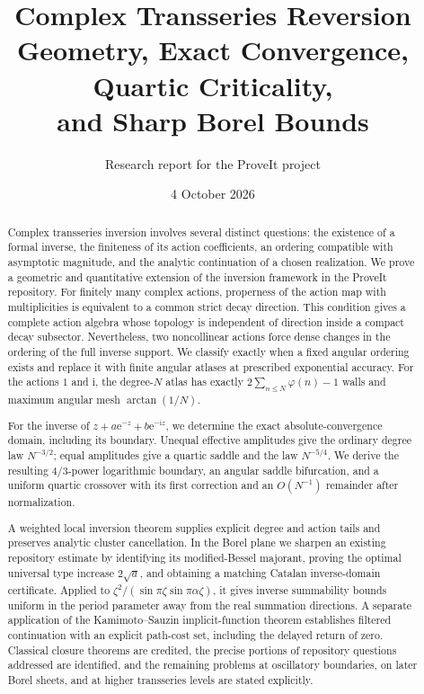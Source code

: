 \documentclass[11pt,a4paper]{article}
\title{\textbf{Complex Transseries Reversion}\\[5pt]
\large Geometry, Exact Convergence, Quartic Criticality,\\
and Sharp Borel Bounds}
\author{Research report for the ProveIt project}
\date{4 October 2026}
\numberwithin{equation}{section}
\theoremstyle{definition}
\theoremstyle{remark}
\newcommand{\ii}{\mathrm i}
\newcommand{\e}{\mathrm e}
\begin{document}
\maketitle
\begin{abstract}
Complex transseries inversion involves several distinct questions: the existence of a
formal inverse, the finiteness of its action coefficients, an ordering compatible with
asymptotic magnitude, and the analytic continuation of a chosen realization. We prove
a geometric and quantitative extension of the inversion framework in the ProveIt
repository. For finitely many complex actions, properness of the action map with
multiplicities is equivalent to a common strict decay direction. This condition gives
a complete action algebra whose topology is independent of direction inside a compact
decay subsector. Nevertheless, two noncollinear actions force dense changes in the
ordering of the full inverse support. We classify exactly when a fixed angular
ordering exists and replace it with finite angular atlases at prescribed exponential
accuracy. For the actions $1$ and $\ii$, the degree-$N$ atlas has exactly
$2\sum_{n\le N}\varphi(n)-1$ walls and maximum angular mesh $\arctan(1/N)$.

For the inverse of $z+a\e^{-z}+b\e^{-\ii z}$, we determine the exact
absolute-convergence domain, including its boundary. Unequal effective amplitudes
give the ordinary degree law $N^{-3/2}$; equal amplitudes give a quartic saddle
and the law $N^{-5/4}$. We derive the resulting $4/3$-power logarithmic boundary,
an angular saddle bifurcation, and a uniform quartic crossover with its first
correction and an $O(N^{-1})$ remainder after normalization.

A weighted local inversion theorem supplies explicit degree and action tails and
preserves analytic cluster cancellation. In the Borel plane we sharpen an existing
repository estimate by identifying its modified-Bessel majorant, proving the
optimal universal type increase $2\sqrt{a}$, and obtaining a matching Catalan
inverse-domain certificate. Applied to
$\zeta^2/(\sin\pi\zeta\sin\pi\alpha\zeta)$, it gives inverse summability bounds uniform
in the period parameter away from the real summation directions. A separate application
of the Kamimoto--Sauzin implicit-function theorem establishes filtered continuation
with an explicit path-cost set, including the delayed return of zero. Classical closure
theorems are credited, the precise portions of repository questions addressed are
identified, and the remaining problems at oscillatory boundaries, on later Borel
sheets, and at higher transseries levels are stated explicitly.
\end{abstract}
\end{document}
